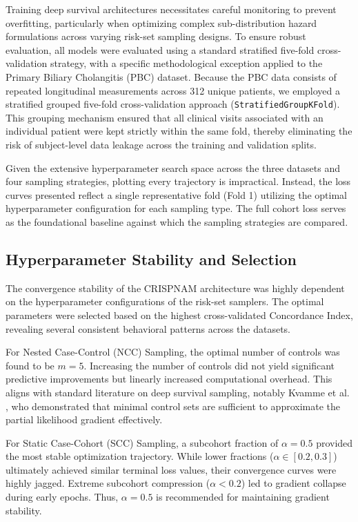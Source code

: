 \documentclass[a4paper,twoside,12pt]{report}
\begin{document}
Training deep survival architectures necessitates careful monitoring to prevent overfitting, particularly when optimizing complex sub-distribution hazard formulations across varying risk-set sampling designs. To ensure robust evaluation, all models were evaluated using a standard stratified five-fold cross-validation strategy, with a specific methodological exception applied to the Primary Biliary Cholangitis (PBC) dataset. Because the PBC data consists of repeated longitudinal measurements across 312 unique patients, we employed a stratified grouped five-fold cross-validation approach (\texttt{StratifiedGroupKFold}). This grouping mechanism ensured that all clinical visits associated with an individual patient were kept strictly within the same fold, thereby eliminating the risk of subject-level data leakage across the training and validation splits.

Given the extensive hyperparameter search space across the three datasets and four sampling strategies, plotting every trajectory is impractical. Instead, the loss curves presented reflect a single representative fold (Fold 1) utilizing the optimal hyperparameter configuration for each sampling type. The full cohort loss serves as the foundational baseline against which the sampling strategies are compared.

\subsection{Hyperparameter Stability and Selection}

The convergence stability of the CRISPNAM architecture was highly dependent on the hyperparameter configurations of the risk-set samplers. The optimal parameters were selected based on the highest cross-validated Concordance Index, revealing several consistent behavioral patterns across the datasets.

For Nested Case-Control (NCC) Sampling, the optimal number of controls was found to be $m = 5$. Increasing the number of controls did not yield significant predictive improvements but linearly increased computational overhead. This aligns with standard literature on deep survival sampling, notably Kvamme et al. \citep{kvamme2019}, who demonstrated that minimal control sets are sufficient to approximate the partial likelihood gradient effectively.

For Static Case-Cohort (SCC) Sampling, a subcohort fraction of $\alpha = 0.5$ provided the most stable optimization trajectory. While lower fractions ($\alpha \in [0.2, 0.3]$) ultimately achieved similar terminal loss values, their convergence curves were highly jagged. Extreme subcohort compression ($\alpha < 0.2$) led to gradient collapse during early epochs. Thus, $\alpha = 0.5$ is recommended for maintaining gradient stability.
\end{document}
